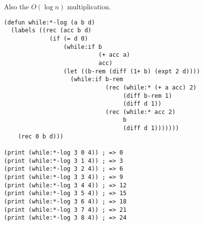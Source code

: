\documentclass{article}
\begin{document}
Also the $O(\log n)$ multiplication.

\begin{verbatim}
(defun while:*-log (a b d)
  (labels ((rec (acc b d)
             (if (= d 0)
                 (while:if b
                           (+ acc a)
                           acc)
                 (let ((b-rem (diff (1+ b) (expt 2 d))))
                   (while:if b-rem
                             (rec (while:* (+ a acc) 2)
                                  (diff b-rem 1)
                                  (diff d 1))
                             (rec (while:* acc 2)
                                  b
                                  (diff d 1)))))))
    (rec 0 b d)))

(print (while:*-log 3 0 4)) ; => 0
(print (while:*-log 3 1 4)) ; => 3
(print (while:*-log 3 2 4)) ; => 6
(print (while:*-log 3 3 4)) ; => 9
(print (while:*-log 3 4 4)) ; => 12
(print (while:*-log 3 5 4)) ; => 15
(print (while:*-log 3 6 4)) ; => 18
(print (while:*-log 3 7 4)) ; => 21
(print (while:*-log 3 8 4)) ; => 24
\end{verbatim}
\end{document}

